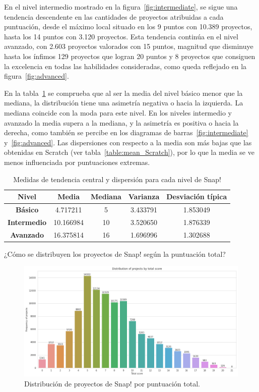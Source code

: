 \documentclass[a4paper, 12pt]{book}
\begin{document}
En el nivel intermedio mostrado en la figura~\ref{fig:intermediate}, se sigue una tendencia descendente en las cantidades de proyectos atribuidas a cada puntuación, desde el máximo local situado en los 9 puntos con 10.389 proyectos, hasta los 14 puntos con 3.120 proyectos. Esta tendencia continúa en el nivel avanzado, con 2.603 proyectos valorados con 15 puntos, magnitud que disminuye hasta los ínfimos 129 proyectos que logran 20 puntos y 8 proyectos que consiguen la excelencia en todas las habilidades consideradas, como queda reflejado en la figura~\ref{fig:advanced}.

En la tabla~\ref{table:mean_Snap} se comprueba que al ser la media del nivel básico menor que la mediana, la distribución tiene una asimetría negativa o hacia la izquierda. La mediana coincide con la moda para este nivel. En los niveles intermedio y avanzado la media supera a la mediana, y la asimetría es positiva o hacia la derecha, como también se percibe en los diagramas de barras~\ref{fig:intermediate} y~\ref{fig:advanced}.
Las dispersiones con respecto a la media son más bajas que las obtenidas en Scratch (ver tabla~\ref{table:mean_Scratch}), por lo que la media se ve menos influenciada por puntuaciones extremas. 

\begin{table}[H]
 \begin{center}
  \begin{tabular}{|c|c|c|c|c|}
    \hline
     \textbf{Nivel} & \textbf{Media} & \textbf{Mediana} & \textbf{Varianza} & \textbf{Desviación típica} \\ \hline
    \textbf{Básico} & 4.717211 & 5 & 3.433791 & 1.853049 \\ \hline
    \textbf{Intermedio} & 10.166984 & 10 & 3.520650 & 1.876339 \\ \hline
    \textbf{Avanzado} & 16.375814 & 16 & 1.696996 & 1.302688 \\ \hline
  \end{tabular}
  \caption{Medidas de tendencia central y dispersión para cada nivel de Snap!}
  \label{table:mean_Snap}
 \end{center}
\end{table}

¿Cómo se distribuyen los proyectos de Snap! según la puntuación total?

\begin{figure}[H]
    \centering
    \includegraphics[width=.9\textwidth]{img/frequency_total_score.png}
    \caption{Distribución de proyectos de Snap! por puntuación total.}\label{fig:total}
\end{figure}
\end{document}
